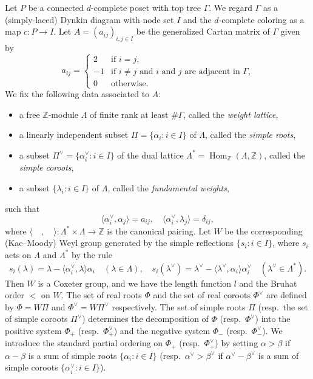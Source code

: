 \documentclass[10pt]{amsart}
\providecommand{\resp}{resp.\ }
\theoremstyle{definition}
\theoremstyle{remark}
\newcommand\Int{\mathbb{Z}}
\DeclareMathOperator{\Hom}{Hom}
\begin{document}
Let $P$ be a connected $d$-complete poset with top tree $\Gamma$.
We regard $\Gamma$ as a (simply-laced) Dynkin diagram with node set $I$ 
and the $d$-complete coloring as a map $c : P \to I$.
Let $A = (a_{ij})_{i,j \in I}$ be the generalized Cartan matrix of $\Gamma$ given by
$$
a_{ij}
 =
\begin{cases}
 2 &\text{if $i=j$,} \\
 -1 &\text{if $i \neq j$ and $i$ and $j$ are adjacent in $\Gamma$,} \\
 0 &\text{otherwise.}
\end{cases}
$$
We fix the following data associated to $A$:
\begin{itemize}
\item
a free $\Int$-module $\Lambda$ of finite rank at least $\# \Gamma$, called the \emph{weight lattice},
\item
a linearly independent subset $\Pi = \{ \alpha_i : i \in I \}$ of $\Lambda$, called the \emph{simple roots},
\item
a subset $\Pi^\vee = \{ \alpha^\vee_i : i \in I \}$ of the dual lattice $\Lambda^* = \Hom_\Int(\Lambda,\Int)$, 
called the \emph{simple coroots},
\item
a subset $\{ \lambda_i : i \in I \}$ of $\Lambda$, called the \emph{fundamental weights},
\end{itemize}
such that
$$
\langle \alpha^\vee_i, \alpha_j \rangle = a_{ij},
\quad
\langle \alpha^\vee_i, \lambda_j \rangle = \delta_{ij},
$$
where $\langle \quad, \quad \rangle : \Lambda^* \times \Lambda \to \Int$ is the canonical pairing.
Let $W$ be the corresponding 
(Kac--Moody) Weyl group generated by the simple reflections $\{ s_i : i \in I \}$, 
where $s_i$ acts on $\Lambda$ and $\Lambda^*$ by the rule
$$
s_i(\lambda) = \lambda - \langle \alpha_i^\vee, \lambda \rangle \alpha_i
\quad(\lambda \in \Lambda),
\quad
s_i(\lambda^\vee) = \lambda^\vee - \langle \lambda^\vee, \alpha_i \rangle \alpha^\vee_i
\quad(\lambda^\vee \in \Lambda^*).
$$
Then $W$ is a Coxeter group, and we have the length function $l$ and the Bruhat order $<$ on $W$.
The set of real roots $\Phi$ and the set of real coroots $\Phi^\vee$ are defined by 
$\Phi = W \Pi$ and $\Phi^\vee = W \Pi^\vee$ respectively.
The set of simple roots $\Pi$ (\resp the set of simple coroots $\Pi^\vee$) determines 
the decomposition of $\Phi$ (\resp $\Phi^\vee$) into the positive system $\Phi_+$ (\resp $\Phi^\vee_+$) and 
the negative system $\Phi_-$ (\resp $\Phi^\vee_-$).
We introduce the standard partial ordering on $\Phi_+$ (\resp $\Phi^\vee_+$) by setting 
$\alpha > \beta$ if $\alpha - \beta$ is a sum of simple roots $\{ \alpha_i : i \in I \}$ 
(\resp $\alpha^\vee > \beta^\vee$ if $\alpha^\vee - \beta^\vee$ is a sum of simple coroots 
$\{ \alpha^\vee_i : i \in I \}$).
\end{document}
